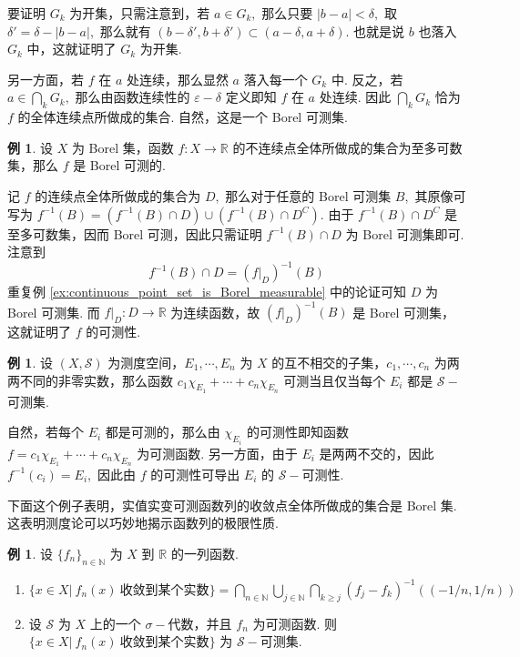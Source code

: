 \documentclass[12pt, a4paper, oneside]{book}
\numberwithin{figure}{section}
\theoremstyle{definition}
\newtheorem{example}[theorem]{例}
\begin{document}
要证明 $G_k$ 为开集，只需注意到，若 $a\in G_k,$ 那么只要 $|b-a|<\delta,$ 取 $\delta'=\delta-|b-a|,$ 那么就有 
$(b-\delta',b+\delta')\subset (a-\delta,a+\delta).$ 也就是说 $b$ 也落入 $G_k$ 中，这就证明了 $G_k$ 为开集. 

另一方面，若 $f$ 在 $a$ 处连续，那么显然 $a$ 落入每一个 $G_k$ 中. 反之，若 $a\in\bigcap_k G_k,$ 那么由函数连续性的 $\varepsilon-\delta$ 定义即知 $f$ 在 $a$ 处连续. 
因此 $\bigcap_k G_k$ 恰为 $f$ 的全体连续点所做成的集合. 自然，这是一个 Borel 可测集.

\begin{example}
    设 $X$ 为 Borel 集，函数 $f:X\to\mathbb R$ 的不连续点全体所做成的集合为至多可数集，那么 $f$ 是 Borel 可测的.
\end{example}

记 $f$ 的连续点全体所做成的集合为 $D,$ 那么对于任意的 Borel 可测集 $B,$ 其原像可写为
$f^{-1}(B)=(f^{-1}(B)\cap D)\cup (f^{-1}(B)\cap D^C).$ 由于 $f^{-1}(B)\cap D^C$ 是至多可数集，因而 Borel 可测，因此只需证明 $f^{-1}(B)\cap D$ 为 Borel 可测集即可. 注意到
\begin{equation}
    f^{-1}(B)\cap D=(f|_D)^{-1}(B)
\end{equation}
重复例 \ref{ex:continuous_point_set_is_Borel_measurable} 中的论证可知 $D$ 为 Borel 可测集.
而 $f|_D:D\to\mathbb R$ 为连续函数，故 $(f|_D)^{-1}(B)$ 是 Borel 可测集，这就证明了 $f$ 的可测性.


\begin{example}
    设 $(X,\mathcal S)$ 为测度空间，$E_1,\cdots,E_n$ 为 $X$ 的互不相交的子集，$c_1,\cdots,c_n$ 为两两不同的非零实数，那么函数 $c_1\chi_{E_1}+\cdots+c_n\chi_{E_n}$ 可测当且仅当每个 $E_i$ 都是 $\mathcal S-$可测集.
\end{example}

自然，若每个 $E_i$ 都是可测的，那么由 $\chi_{E_i}$ 的可测性即知函数 $f=c_1\chi_{E_1}+\cdots+c_n\chi_{E_n}$ 为可测函数. 
另一方面，由于 $E_i$ 是两两不交的，因此 $f^{-1}(c_i)=E_i,$ 因此由 $f$ 的可测性可导出 $E_i$ 的 $\mathcal S-$可测性.

下面这个例子表明，实值实变可测函数列的收敛点全体所做成的集合是 Borel 集. 这表明测度论可以巧妙地揭示函数列的极限性质.
\begin{example}
    设 $\{f_n\}_{n\in\mathbb N}$ 为 $X$ 到 $\mathbb R$ 的一列函数. 
    \begin{enumerate}[label=\alph*)]
        \item $\{x\in X|\ f_n(x)\ \text{收敛到某个实数}\}=\bigcap_{n\in\mathbb N}\bigcup_{j\in\mathbb N}\bigcap_{k\geq j} (f_j-f_k)^{-1}((-1/n,1/n))$
        \item 设 $\mathcal S$ 为 $X$ 上的一个 $\sigma-$代数，并且 $f_n$ 为可测函数. 则 $\{x\in X|\ f_n(x)\ \text{收敛到某个实数}\}$ 为 $\mathcal S-$可测集.
    \end{enumerate}
\end{example}
\end{document}
